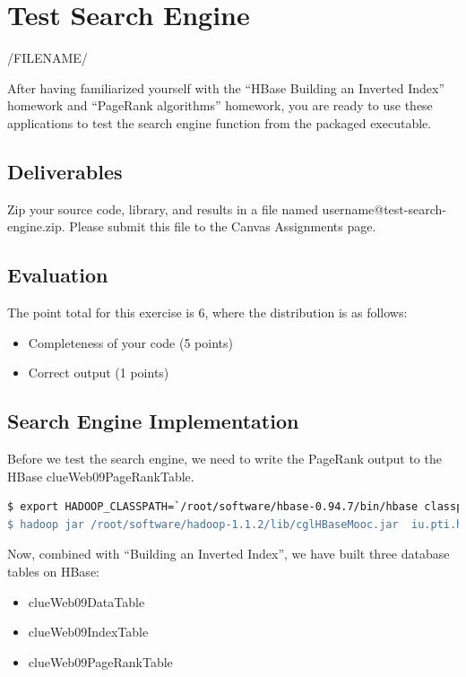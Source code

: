 \section{Test Search Engine}

/FILENAME/

After having familiarized yourself with the ``HBase Building an Inverted
Index'' homework and ``PageRank algorithms'' homework, you are ready to use
these applications to test the search engine function from the packaged
executable.

\subsection{Deliverables}
Zip your source code, library, and results in a file named
username@test-search-engine.zip. Please submit this file to the Canvas
Assignments page.

\subsection{Evaluation}
The point total for this exercise is 6, where the distribution is as follows:
\begin{itemize}
\item Completeness of your code (5 points)
\item Correct output (1 points)
\end{itemize}

\subsection{Search Engine Implementation}
Before we test the search engine, we need to write the PageRank output to the
HBase clueWeb09PageRankTable.

\begin{lstlisting}[language=bash]
$ export HADOOP_CLASSPATH=`/root/software/hbase-0.94.7/bin/hbase classpath'
$ hadoop jar /root/software/hadoop-1.1.2/lib/cglHBaseMooc.jar  iu.pti.hbaseapp.clueweb09.PageRankTableLoader  /root/MoocHomeworks/HBaseInvertedIndexing/resources/en0000-01and02.docToNodeIdx.txt  /root/MoocHomeworks/HBaseInvertedIndexing/resources/en0000-01and02_reset_idx_and_square_pagerank.out
\end{lstlisting}

Now, combined with ``Building an Inverted Index'', we have built three database
tables on HBase:

\begin{itemize}
\item clueWeb09DataTable
\item clueWeb09IndexTable
\item clueWeb09PageRankTable
\end{itemize}

